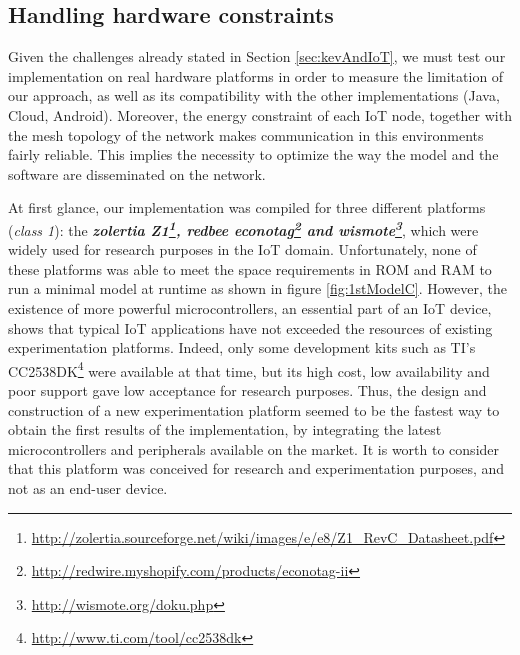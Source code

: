 \subsection{Handling hardware constraints}

Given the challenges already stated in Section \ref{sec:kevAndIoT}, we must test our implementation on real hardware platforms in order to measure the limitation of our approach, as well as its compatibility with the other implementations (Java, Cloud, Android).
Moreover, the energy constraint of each IoT node, together with the mesh topology of the network makes communication in this environments fairly reliable.
This implies the necessity to optimize the way the model and the software are disseminated on the network.

At first glance, our implementation was compiled for three different platforms (\textit{class 1}): the \textit{\textbf{zolertia Z1\footnote{\url{http://zolertia.sourceforge.net/wiki/images/e/e8/Z1_RevC_Datasheet.pdf}}, redbee econotag\footnote{\url{http://redwire.myshopify.com/products/econotag-ii}} and wismote\footnote{\url{http://wismote.org/doku.php}}}}, which were widely used for research purposes in the IoT domain.
Unfortunately, none of these platforms was able to meet the space requirements in ROM and RAM to run a minimal model at runtime as shown in figure \ref{fig:1stModelC}.
However, the existence of more powerful microcontrollers, an essential part of an IoT device, shows that typical IoT applications have not exceeded the resources of existing experimentation platforms.
Indeed, only some development kits such as TI's CC2538DK\footnote{\url{http://www.ti.com/tool/cc2538dk}} were available at that time, but its high cost, low availability and poor support gave low acceptance for research purposes.
Thus, the design and construction of a new experimentation platform seemed to be the fastest way to obtain the first results of the implementation, by integrating the latest microcontrollers and peripherals available on the market.
It is worth to consider that this platform was conceived for research and experimentation purposes, and not as an end-user device.

